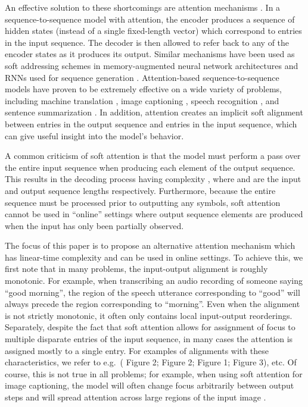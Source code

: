 \documentclass{article}
\begin{document}
An effective solution to these shortcomings are attention mechanisms .
In a sequence-to-sequence model with attention, the encoder produces a sequence of hidden states (instead of a single fixed-length vector) which correspond to entries in the input sequence.
The decoder is then allowed to refer back to any of the encoder states as it produces its output.
Similar mechanisms have been used as soft addressing schemes in memory-augmented neural network architectures  and RNNs used for sequence generation .
Attention-based sequence-to-sequence models have proven to be extremely effective on a wide variety of problems, including machine translation , image captioning , speech recognition , and sentence summarization .
In addition, attention creates an implicit soft alignment between entries in the output sequence and entries in the input sequence, which can give useful insight into the model's behavior.

A common criticism of soft attention is that the model must perform a pass over the entire input sequence when producing each element of the output sequence.
This results in the decoding process having complexity , where  and  are the input and output sequence lengths respectively.
Furthermore, because the entire sequence must be processed prior to outputting any symbols, soft attention cannot be used in ``online'' settings where output sequence elements are produced when the input has only been partially observed.

The focus of this paper is to propose an alternative attention mechanism which has linear-time complexity and can be used in online settings.
To achieve this, we first note that in many problems, the input-output alignment is roughly monotonic.
For example, when transcribing an audio recording of someone saying ``good morning'', the region of the speech utterance corresponding to ``good'' will always precede the region corresponding to ``morning''.
Even when the alignment is not strictly monotonic, it often only contains local input-output reorderings.
Separately, despite the fact that soft attention allows for assignment of focus to multiple disparate entries of the input sequence, in many cases the attention is assigned mostly to a single entry.
For examples of alignments with these characteristics, we refer to e.g.\ (\citealt{chorowski2015attention} Figure 2; \citealt{chan2016listen} Figure 2; \citealt{rush2015neural} Figure 1; \citealt{bahdanau2014neural} Figure 3), etc.
Of course, this is not true in all problems; for example, when using soft attention for image captioning, the model will often change focus arbitrarily between output steps and will spread attention across large regions of the input image .
\end{document}
